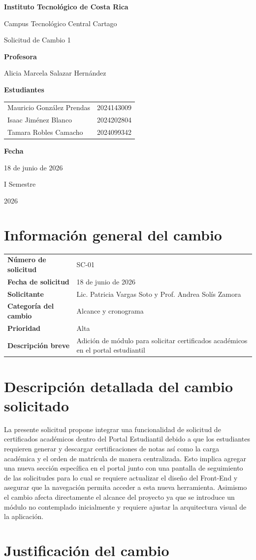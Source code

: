 \documentclass[11pt,spanish]{article}
\title{\DocumentoTitulo}
\author{\AutoresPortada}
\date{\FechaDocumento}
\makeatletter
\newcommand{\Institucion}{Instituto Tecnológico de Costa Rica}
\newcommand{\Campus}{Campus Tecnológico Central Cartago}
\newcommand{\DocumentoTitulo}{Solicitud de Cambio 1}
\newcommand{\Profesor}{Alicia Marcela Salazar Hernández}
\newcommand{\FechaDocumento}{18 de junio de 2026}
\newcommand{\PeriodoAcademico}{I Semestre}
\newcommand{\AnioDocumento}{2026}
\newcommand{\AutoresPortada}{%
    \begin{tabular}{l@{\hspace{1.5cm}}r}
        Mauricio González Prendas & 2024143009\\
        Isaac Jiménez Blanco & 2024202804\\
        Tamara Robles Camacho & 2024099342
    \end{tabular}%
}
\newcommand{\MakeCover}{%
\begin{titlepage}
\thispagestyle{empty}
\centering

{\bfseries \huge \Institucion \par}
\vspace{0.25cm}
{\LARGE \Campus \par}

\vfill

{\huge \DocumentoTitulo \par}

\vfill

{\bfseries \LARGE Profesora \par}
{\Large \Profesor \par}

\vfill

{\bfseries \LARGE Estudiantes \par}
{\Large \AutoresPortada \par}

\vfill

{\bfseries\LARGE Fecha \par}
{\Large \FechaDocumento \par}

\vfill

{\LARGE \PeriodoAcademico \par}
{\LARGE \AnioDocumento \par}

\end{titlepage}%
}
\makeatother
\begin{document}
\hypersetup{pageanchor=false}

\MakeCover

\pagestyle{empty}
\tableofcontents
\clearpage
{}
\hypersetup{pageanchor=true}
\pagestyle{fancy}

\section{Información general del cambio}

\begin{table}[H]
\centering
\begin{tabularx}{\textwidth}{p{5cm} Y}
\toprule
\textbf{Número de solicitud} & SC-01 \\
\textbf{Fecha de solicitud} & 18 de junio de 2026 \\
\textbf{Solicitante} & Lic. Patricia Vargas Soto y Prof. Andrea Solís Zamora \\
\textbf{Categoría del cambio} & Alcance y cronograma \\
\textbf{Prioridad} & Alta \\
\textbf{Descripción breve} & Adición de módulo para solicitar certificados académicos en el portal estudiantil \\
\bottomrule
\end{tabularx}
\end{table}

\section{Descripción detallada del cambio solicitado}

La presente solicitud propone integrar una funcionalidad de solicitud de certificados académicos dentro del Portal Estudiantil debido a que los estudiantes requieren generar y descargar certificaciones de notas así como la carga académica y el orden de matrícula de manera centralizada. Esto implica agregar una nueva sección específica en el portal junto con una pantalla de seguimiento de las solicitudes para lo cual se requiere actualizar el diseño del Front-End y asegurar que la navegación permita acceder a esta nueva herramienta. Asimismo el cambio afecta directamente el alcance del proyecto ya que se introduce un módulo no contemplado inicialmente y requiere ajustar la arquitectura visual de la aplicación.

\section{Justificación del cambio}
\end{document}
